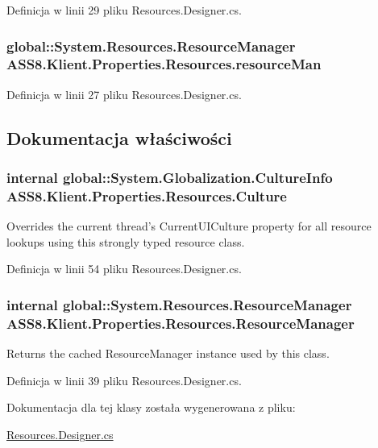 Definicja w linii 29 pliku Resources.Designer.cs.\hypertarget{a00022_3a3cac266a27008b10c3849a4ee74cb9}{
\subsubsection[{resourceMan}]{\setlength{\rightskip}{0pt plus 5cm}global::System.Resources.ResourceManager {\bf ASS8.Klient.Properties.Resources.resourceMan}}}
\label{d7/de0/a00022_3a3cac266a27008b10c3849a4ee74cb9}




Definicja w linii 27 pliku Resources.Designer.cs.

\subsection{Dokumentacja właściwości}
\hypertarget{a00022_a857477b89977c77ae86ed5d16ecc759}{
\subsubsection[{Culture}]{\setlength{\rightskip}{0pt plus 5cm}internal global::System.Globalization.CultureInfo ASS8.Klient.Properties.Resources.Culture}}
\label{d7/de0/a00022_a857477b89977c77ae86ed5d16ecc759}


Overrides the current thread's CurrentUICulture property for all resource lookups using this strongly typed resource class. 



Definicja w linii 54 pliku Resources.Designer.cs.\hypertarget{a00022_f756a9c764abf399cb2712c4e3585d68}{
\subsubsection[{ResourceManager}]{\setlength{\rightskip}{0pt plus 5cm}internal global::System.Resources.ResourceManager ASS8.Klient.Properties.Resources.ResourceManager}}
\label{d7/de0/a00022_f756a9c764abf399cb2712c4e3585d68}


Returns the cached ResourceManager instance used by this class. 



Definicja w linii 39 pliku Resources.Designer.cs.

Dokumentacja dla tej klasy została wygenerowana z pliku:\begin{CompactItemize}
\item 
\hyperlink{a00051}{Resources.Designer.cs}\end{CompactItemize}
